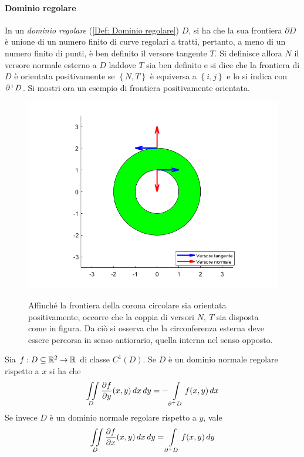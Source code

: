  \paragraph{Dominio regolare}
 In un \textit{dominio regolare} (\ref{Def: Dominio regolare}) $D$, si ha che la sua frontiera $\partial D$ è unione di un numero finito di curve regolari a tratti, pertanto, a meno di un numero finito di punti, è ben definito il versore tangente $T$. Si definisce allora $N$ il versore normale esterno a $D$ laddove $T$ sia ben definito e si dice che la frontiera di $D$ è orientata positivamente se $\left\{N,T\right\}$ è equiversa a $\left\{i, j\right\}$ e lo si indica con $\partial^+ D$.
 Si mostri ora un esempio di frontiera positivamente orientata.
 \begin{figure}[H]
     \centering
     \begin{minipage}{0.5\textwidth}
     \includegraphics[width=\textwidth]{Capitoli/Capitolo5/Bordo orientato.png}
     \end{minipage}
     \begin{minipage}{0.4\textwidth}
         Affinché la frontiera della corona circolare sia orientata positivamente, occorre che la coppia di versori $N,\ T$ sia disposta come in figura. Da ciò si osserva che la circonferenza esterna deve essere percorsa in senso antiorario, quella interna nel senso opposto.
     \end{minipage}
 \end{figure}
 \begin{theorem}
 Sia $f: D\subseteq \mathbb{R}^2 \to \mathbb{R}$ di classe $C^1(D)$. Se $D$ è un dominio normale regolare rispetto a $x$ si ha che
 \begin{equation} \label{Eq: Gauss-Green per dimostrazione}
     \iint\limits_D{\frac{\partial f}{\partial y}(x,y)}\,dx\,dy= -\int\limits_{\partial^+ D}{f(x,y)}\,dx
 \end{equation}
     Se invece $D$ è un dominio normale regolare rispetto a $y$, vale
     \begin{equation}
    \iint\limits_D{\frac{\partial f}{\partial x}(x,y)}\,dx\,dy= \int\limits_{\partial^+ D}{f(x,y)}\,dy
     \end{equation}
 \end{theorem}
